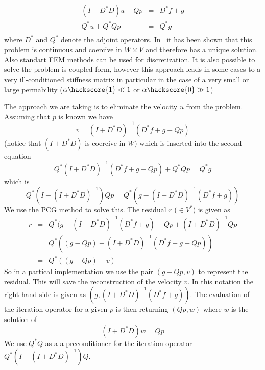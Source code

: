 \begin{equation}
\begin{array}{rcl}
(I+D^*D)u + Qp & = & D^*f + g \\
Q^*u  + Q^*Q p & = & Q^* g \\ 
\end{array}
\end{equation} 
where $D^*$ and $Q^*$ denote the adjoint operators. 
In~\cite{XXX} it has been shown that this problem is continuous and coercive in $W \times V$ and therefore has a unique solution. Also standart FEM methods can be used for discretization. It is also possible 
to solve the problem is coupled form, however this approach leads in some cases to a very ill-conditioned stiffness matrix in particular in the case of a very small or large permability ($\alpha\hackscore{1} \ll 1$ or $\alpha\hackscore{0} \gg 1$)  

The approach we are taking is to eliminate the velocity $u$ from the problem. Assuming that $p$ is known we have
\begin{equation}
v= (I+D^*D)^{-1} (D^*f + g - Qp)
\end{equation} 
(notice that $(I+D^*D)$ is coercive in $W$) which is inserted into the second equation
\begin{equation}
Q^* (I+D^*D)^{-1} (D^*f + g - Qp) + Q^* Q p = Q^* g 
\end{equation} 
which is 
\begin{equation}
Q^* ( I - (I+D^*D)^{-1} ) Q p = Q^* ( g -(I+D^*D)^{-1} (D^*f + g) ) 
\end{equation} 
We use the PCG method to solve this. The residual $r$ ($\in V^*$) is given as
\begin{equation}
\begin{array}{rcl}
r & = & Q^* ( g -(I+D^*D)^{-1} (D^*f + g) - Qp + (I+D^*D)^{-1}Q p \\
& =&  Q^* \left( (g-Qp) - (I+D^*D)^{-1} (D^*f + g - Qp) \right) \\
& =&  Q^* \left( (g-Qp) - v \right)
\end{array}
\end{equation} 
So in a partical implementation we use the pair $(g-Qp,v)$ to represent the residual. This will save the
reconstruction of the velocity $v$. In this notation the right hand side is given as 
$(g,(I+D^*D)^{-1} (D^*f + g))$. The evaluation of the iteration operator for a given $p$ is then 
returning $(Qp,w)$ where $w$ is the solution of 
\begin{equation}\label{UPDATE W}
(I+D^*D)w = Qp
\end{equation}
We use $Q^*Q$ as a a preconditioner for the iteration operator $Q^* ( I - (I+D^*D)^{-1} ) Q$.

